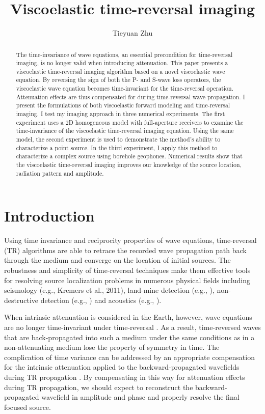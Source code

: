 \author{Tieyuan Zhu}
\title{Viscoelastic time-reversal imaging}


\begin{abstract}
 The time-invariance of wave equations, an essential precondition for time-reversal imaging, is no longer valid when introducing attenuation. This paper presents a viscoelastic time-reversal imaging algorithm based on a novel viscoelastic wave equation. By reversing the sign of both the P- and S-wave loss operators, the viscoelastic wave equation becomes time-invariant for the time-reversal operation. Attenuation effects are thus compensated for during time-reversal wave propagation. I present the formulations of both viscoelastic forward modeling and time-reversal imaging. I test my imaging approach in three numerical experiments. The first experiment uses a 2D homogeneous model with full-aperture receivers to examine the time-invariance of the viscoelastic time-reversal imaging equation. Using the same model, the second experiment is used to demonstrate the method’s ability to characterize a point source. In the third experiment, I apply this method to characterize a complex source using borehole geophones. Numerical results show that the viscoelastic time-reversal imaging improves our knowledge of the source location, radiation pattern and amplitude.
\end{abstract}

\section{Introduction}

Using time invariance and reciprocity properties of wave equations, time-reversal (TR) algorithms are able to retrace the recorded wave propagation path back through the medium and converge on the location of initial sources. The robustness and simplicity of time-reversal techniques make them effective tools for resolving source localization problems in numerous physical fields including seismology (e.g., Kremers et al., 2011), land-mine detection (e.g., \citealp{norville07}), non-destructive detection (e.g., \citealp{saenger11}) and acoustics (e.g., \citealp{fink06}). 

When intrinsic attenuation is considered in the Earth, however, wave equations are no longer time-invariant under time-reversal \citep{fink06}. As a result, time-reversed waves that are back-propagated into such a medium under the same conditions as in a non-attenuating medium lose the property of symmetry in time. The complication of time variance can be addressed by an appropriate compensation for the intrinsic attenuation applied to the backward-propagated wavefields during TR propagation \citep{gosselet07,zhu14b}. By compensating in this way for attenuation effects during TR propagation, we should expect to reconstruct the backward-propagated wavefield in amplitude and phase and properly resolve the final focused source. 


